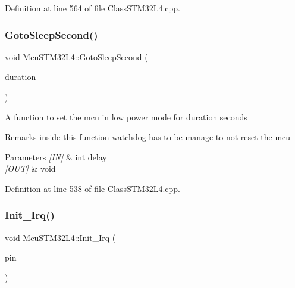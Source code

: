 Definition at line 564 of file Class\+S\+T\+M32\+L4.\+cpp.

\mbox{\label{class_mcu_s_t_m32_l4_a083d387963ab5fcd70332b156b3762c6}} 
\subsubsection{\texorpdfstring{Goto\+Sleep\+Second()}{GotoSleepSecond()}}
{\footnotesize\ttfamily void Mcu\+S\+T\+M32\+L4\+::\+Goto\+Sleep\+Second (\begin{DoxyParamCaption}\item[{int}]{duration }\end{DoxyParamCaption})}

A function to set the mcu in low power mode for duration seconds \begin{DoxyRemark}{Remarks}
inside this function watchdog has to be manage to not reset the mcu 
\end{DoxyRemark}

\begin{DoxyParams}{Parameters}
{\em \mbox{[}\+I\+N\mbox{]}} & int delay \\
\hline
{\em \mbox{[}\+O\+U\+T\mbox{]}} & void \\
\hline
\end{DoxyParams}


Definition at line 538 of file Class\+S\+T\+M32\+L4.\+cpp.

\mbox{\label{class_mcu_s_t_m32_l4_a967ed67d53d5057beba267eab1ddbf67}} 
\subsubsection{\texorpdfstring{Init\+\_\+\+Irq()}{Init\_Irq()}}
{\footnotesize\ttfamily void Mcu\+S\+T\+M32\+L4\+::\+Init\+\_\+\+Irq (\begin{DoxyParamCaption}\item[{\mbox{\hyperlink{_class_s_t_m32_l0_8h_a5ceb873075d76667eb54dc6a7d2734d1}{Pin\+Name}}}]{pin }\end{DoxyParamCaption})}



